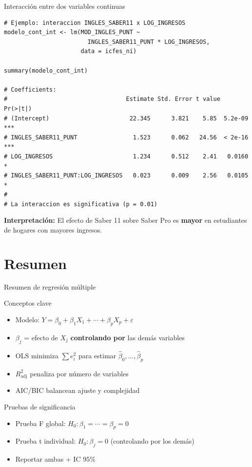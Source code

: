 \documentclass[aspectratio=169, 11pt]{beamer}
\begin{document}
\begin{frame}[fragile]{Interacción entre dos variables continuas}
\begin{lstlisting}
# Ejemplo: interaccion INGLES_SABER11 x LOG_INGRESOS
modelo_cont_int <- lm(MOD_INGLES_PUNT ~
                        INGLES_SABER11_PUNT * LOG_INGRESOS,
                      data = icfes_ni)

summary(modelo_cont_int)

# Coefficients:
#                                  Estimate Std. Error t value Pr(>|t|)
# (Intercept)                       22.345      3.821    5.85  5.2e-09 ***
# INGLES_SABER11_PUNT                1.523      0.062   24.56  < 2e-16 ***
# LOG_INGRESOS                       1.234      0.512    2.41   0.0160 *
# INGLES_SABER11_PUNT:LOG_INGRESOS   0.023      0.009    2.56   0.0105 *
#
# La interaccion es significativa (p = 0.01)
\end{lstlisting}

\vspace{0.2cm}
\textbf{Interpretación:} El efecto de Saber 11 sobre Saber Pro es \textbf{mayor} en estudiantes de hogares con mayores ingresos.
\end{frame}

\section{Resumen}

\begin{frame}{Resumen de regresión múltiple}
\begin{block}{Conceptos clave}
\begin{itemize}
  \item Modelo: $Y = \beta_0 + \beta_1 X_1 + \cdots + \beta_p X_p + \varepsilon$
  \item $\beta_j$ = efecto de $X_j$ \textbf{controlando por} las demás variables
  \item OLS minimiza $\sum e_i^2$ para estimar $\hat{\beta}_0, \ldots, \hat{\beta}_p$
  \item $R^2_{\text{adj}}$ penaliza por número de variables
  \item AIC/BIC balancean ajuste y complejidad
\end{itemize}
\end{block}

\begin{block}{Pruebas de significancia}
\begin{itemize}
  \item Prueba F global: $H_0: \beta_1 = \cdots = \beta_p = 0$
  \item Prueba t individual: $H_0: \beta_j = 0$ (controlando por los demás)
  \item Reportar ambas + IC 95\%
\end{itemize}
\end{block}
\end{frame}
\end{document}
